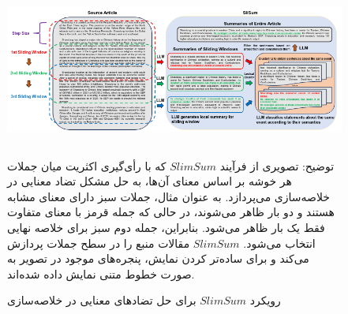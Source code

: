 \begin{figure}[!h]
	\begin{center}
		\includegraphics[height=5cm]{slimsum.png}
	\end{center}
	\caption{ رویکرد $SlimSum$ برای حل تضادهای معنایی در خلاصه‌سازی }
	\small{
		
		توضیح: تصویری از فرآیند $SlimSum$ که با رأی‌گیری اکثریت میان جملات هر خوشه بر اساس معنای آن‌ها، به حل مشکل تضاد معنایی در خلاصه‌سازی می‌پردازد. به عنوان مثال، جملات سبز دارای معنای مشابه هستند و دو بار ظاهر می‌شوند، در حالی که جمله قرمز با معنای متفاوت فقط یک بار ظاهر می‌شود. بنابراین، جمله دوم سبز برای خلاصه نهایی انتخاب می‌شود. $SlimSum$ مقالات منبع را در سطح جملات پردازش می‌کند و برای ساده‌تر کردن نمایش، پنجره‌های موجود در تصویر به صورت خطوط متنی نمایش داده شده‌اند\cite{li-etal-2024-improving-faithfulness}. }
	\label{fig:slimsum}
	
	\medskip
	
\end{figure}




